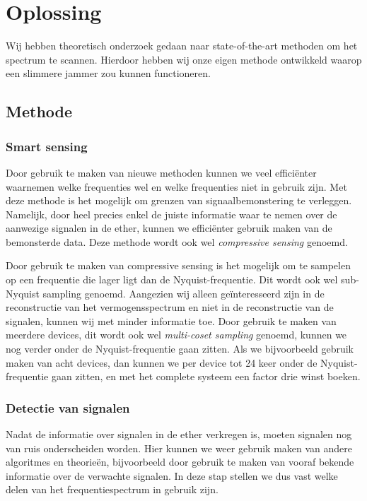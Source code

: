 \documentclass[oneside, a4paper, openany]{memoir}
\begin{document}
\chapter{Oplossing}
Wij hebben theoretisch onderzoek gedaan naar state-of-the-art methoden om het spectrum te scannen. Hierdoor hebben wij onze eigen methode ontwikkeld waarop een slimmere jammer zou kunnen functioneren.


\section{Methode}
\subsection{Smart sensing}
Door gebruik te maken van nieuwe methoden kunnen we veel efficiënter waarnemen welke frequenties wel en welke frequenties niet in gebruik zijn. Met deze methode is het mogelijk om grenzen van signaalbemonstering te verleggen. Namelijk, door heel precies enkel de juiste informatie waar te nemen over de aanwezige signalen in de ether, kunnen we efficiënter gebruik maken van de bemonsterde data. Deze methode wordt ook wel \textit{compressive sensing} genoemd.

\begin{blockDetail}
Door gebruik te maken van compressive sensing is het mogelijk om te sampelen op een frequentie die lager ligt dan de Nyquist-frequentie. Dit wordt ook wel sub-Nyquist sampling genoemd. Aangezien wij alleen geïnteresseerd zijn in de reconstructie van het vermogensspectrum en niet in de reconstructie van de signalen, kunnen wij met minder informatie toe. Door gebruik te maken van meerdere devices, dit wordt ook wel \textit{multi-coset sampling} genoemd, kunnen we nog verder onder de Nyquist-frequentie gaan zitten. Als we bijvoorbeeld gebruik maken van acht devices, dan kunnen we per device tot 24 keer onder de Nyquist-frequentie gaan zitten, en met het complete systeem een factor drie winst boeken. \cite{ariananda2011multicoset}\cite{ariananda2012compressive}
\end{blockDetail}

\subsection{Detectie van signalen}
Nadat de informatie over signalen in de ether verkregen is, moeten signalen nog van ruis onderscheiden worden. Hier kunnen we weer gebruik maken van andere algoritmes en theorieën, bijvoorbeeld door gebruik te maken van vooraf bekende informatie over de verwachte signalen. In deze stap stellen we dus vast welke delen van het frequentiespectrum in gebruik zijn.
\end{document}
